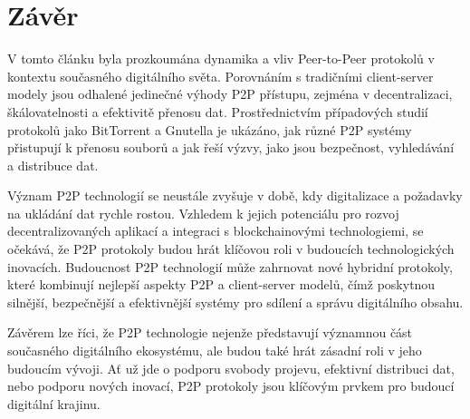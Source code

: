 \documentclass[10pt,twoside,czech,a4paper]{article}
\begin{document}
\section{Závěr}

V tomto článku byla prozkoumána dynamika a vliv Peer-to-Peer protokolů v kontextu současného digitálního světa.
Porovnáním s tradičními client-server modely jsou odhalené jedinečné výhody P2P přístupu, zejména v decentralizaci, škálovatelnosti a efektivitě přenosu dat.
Prostřednictvím případových studií protokolů jako BitTorrent a Gnutella je ukázáno, jak různé P2P systémy přistupují k přenosu souborů a jak řeší výzvy, jako jsou bezpečnost, vyhledávání a distribuce dat.

Význam P2P technologií se neustále zvyšuje v době, kdy digitalizace a požadavky na ukládání dat rychle rostou.
Vzhledem k jejich potenciálu pro rozvoj decentralizovaných aplikací a integraci s blockchainovými technologiemi, se očekává, že P2P protokoly budou hrát klíčovou roli v budoucích technologických inovacích.
Budoucnost P2P technologií může zahrnovat nové hybridní protokoly, které kombinují nejlepší aspekty P2P a client-server modelů, čímž poskytnou silnější, bezpečnější a efektivnější systémy pro sdílení a správu digitálního obsahu.

Závěrem lze říci, že P2P technologie nejenže představují významnou část současného digitálního ekosystému, ale budou také hrát zásadní roli v jeho budoucím vývoji.
Ať už jde o podporu svobody projevu, efektivní distribuci dat, nebo podporu nových inovací, P2P protokoly jsou klíčovým prvkem pro budoucí digitální krajinu.




\end{document}
